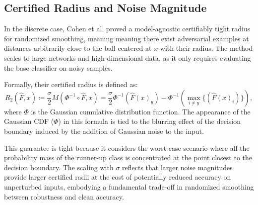 \subsection{Certified Radius and Noise Magnitude}\label{subsec:certified-radius-and-noise-magnitude}
In the discrete case, Cohen et al.
proved a model-agnostic certifiably tight radius for randomized smoothing, meaning meaning there exist adversarial examples at distances arbitrarily close to the ball centered at $x$ with their radius.
The method scales to large networks and high-dimensional data, as it only requires evaluating the base classifier on noisy samples.

Formally, their certified radius is defined as:
\[
    R_2(\hat{F},x) \coloneqq \frac{\sigma}{2}M(\Phi^{-1}\circ\hat{F},x)=\frac{\sigma}{2}\Phi^{-1}(\hat{F}(x)_{y})-\Phi^{-1}(\max_{i \neq y}\{ (\hat{F}(x)_i) \}),
\]
where $\Phi$ is the Gaussian cumulative distribution function.
The appearance of the Gaussian CDF ($\Phi$) in this formula is tied to the blurring effect of the decision boundary induced by the addition of Gaussian noise to the input.

This guarantee is tight because it considers the worst-case scenario where all the probability mass of the runner-up class is concentrated at the point closest to the decision boundary.
The scaling with $\sigma$ reflects that larger noise magnitudes provide larger certified radii at the cost of potentially reduced accuracy on unperturbed inputs, embodying a fundamental trade-off in randomized smoothing between robustness and clean accuracy.